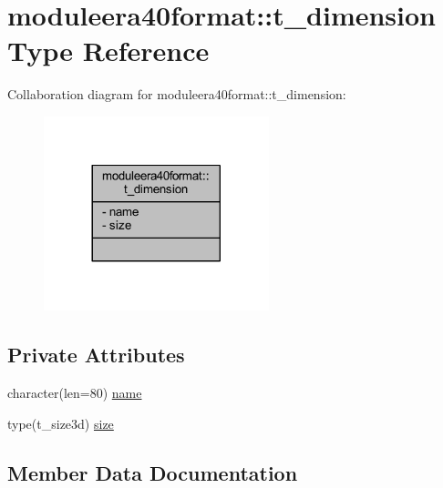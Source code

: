 \hypertarget{structmoduleera40format_1_1t__dimension}{}\section{moduleera40format\+:\+:t\+\_\+dimension Type Reference}
\label{structmoduleera40format_1_1t__dimension}


Collaboration diagram for moduleera40format\+:\+:t\+\_\+dimension\+:\nopagebreak
\begin{figure}[H]
\begin{center}
\leavevmode
\includegraphics[width=185pt]{structmoduleera40format_1_1t__dimension__coll__graph}
\end{center}
\end{figure}
\subsection*{Private Attributes}
\begin{DoxyCompactItemize}
\item 
character(len=80) \mbox{\hyperlink{structmoduleera40format_1_1t__dimension_a319f4316e52b6db102fae7eb84878acd}{name}}
\item 
type(t\+\_\+size3d) \mbox{\hyperlink{structmoduleera40format_1_1t__dimension_a7cfb2eb021976afd0369c48b1d273da8}{size}}
\end{DoxyCompactItemize}


\subsection{Member Data Documentation}
\mbox{\label{structmoduleera40format_1_1t__dimension_a319f4316e52b6db102fae7eb84878acd}} 
